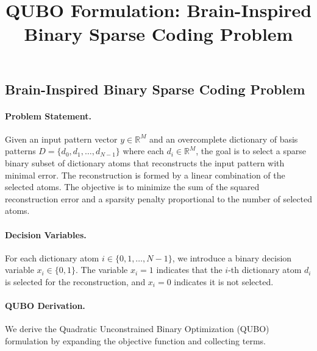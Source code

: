 \documentclass[12pt]{article}
\title{QUBO Formulation: Brain-Inspired Binary Sparse Coding Problem}
\date{}
\begin{document}
\maketitle

\subsection*{Brain-Inspired Binary Sparse Coding Problem}

\paragraph{Problem Statement.}
Given an input pattern vector $y \in \mathbb{R}^M$ and an overcomplete dictionary of basis patterns $D = \{d_0, d_1, \dots, d_{N-1}\}$ where each $d_i \in \mathbb{R}^M$, the goal is to select a sparse binary subset of dictionary atoms that reconstructs the input pattern with minimal error. The reconstruction is formed by a linear combination of the selected atoms. The objective is to minimize the sum of the squared reconstruction error and a sparsity penalty proportional to the number of selected atoms.

\paragraph{Decision Variables.}
For each dictionary atom $i \in \{0, 1, \dots, N-1\}$, we introduce a binary decision variable $x_i \in \{0, 1\}$. The variable $x_i = 1$ indicates that the $i$-th dictionary atom $d_i$ is selected for the reconstruction, and $x_i = 0$ indicates it is not selected.

\paragraph{QUBO Derivation.}
We derive the Quadratic Unconstrained Binary Optimization (QUBO) formulation by expanding the objective function and collecting terms.
\end{document}
